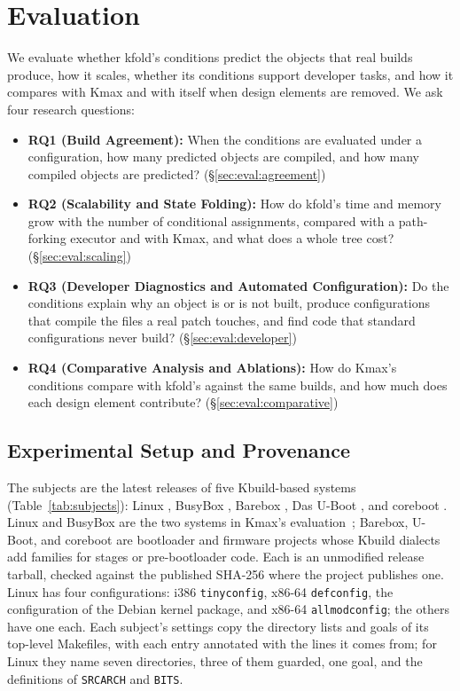 \documentclass[acmsmall]{acmart}
\newcommand{\tool}{\textsf{kfold}\xspace}
\newcommand{\kmax}{\textsf{Kmax}\xspace}
\providecommand{\tightlist}{\setlength{\itemsep}{0pt}\setlength{\parskip}{0pt}}
\begin{document}
\section{Evaluation}
\label{sec:evaluation}

We evaluate whether \tool's conditions predict the objects that real builds produce, how it scales, whether its conditions support developer tasks, and how it compares with \kmax and with itself when design elements are removed.
We ask four research questions:
\begin{itemize}
\tightlist
\item \textbf{RQ1 (Build Agreement):} When the conditions are evaluated under a configuration, how many predicted objects are compiled, and how many compiled objects are predicted? (\S\ref{sec:eval:agreement})
\item \textbf{RQ2 (Scalability and State Folding):} How do \tool's time and memory grow with the number of conditional assignments, compared with a path-forking executor and with \kmax, and what does a whole tree cost? (\S\ref{sec:eval:scaling})
\item \textbf{RQ3 (Developer Diagnostics and Automated Configuration):} Do the conditions explain why an object is or is not built, produce configurations that compile the files a real patch touches, and find code that standard configurations never build? (\S\ref{sec:eval:developer})
\item \textbf{RQ4 (Comparative Analysis and Ablations):} How do \kmax's conditions compare with \tool's against the same builds, and how much does each design element contribute? (\S\ref{sec:eval:comparative})
\end{itemize}

\subsection{Experimental Setup and Provenance}
\label{sec:eval:setup}
The subjects are the latest releases of five Kbuild-based systems (Table~\ref{tab:subjects}): Linux \NLinuxVersion, BusyBox \NBusyboxVersion, Barebox \NBareboxVersion, Das U-Boot \NUbootVersion, and coreboot \NCorebootVersion.
Linux and BusyBox are the two systems in \kmax's evaluation~\cite{gazzillo2017kmax}; Barebox, U-Boot, and coreboot are bootloader and firmware projects whose Kbuild dialects add families for stages or pre-bootloader code.
Each is an unmodified release tarball, checked against the published SHA-256 where the project publishes one.
Linux has four configurations: i386 \texttt{tinyconfig}, x86-64 \texttt{defconfig}, the configuration of the Debian kernel package, and x86-64 \texttt{allmodconfig}; the others have one each.
Each subject's settings copy the directory lists and goals of its top-level Makefiles, with each entry annotated with the lines it comes from; for Linux they name seven directories, three of them guarded, one goal, and the definitions of \texttt{SRCARCH} and \texttt{BITS}.
\end{document}
